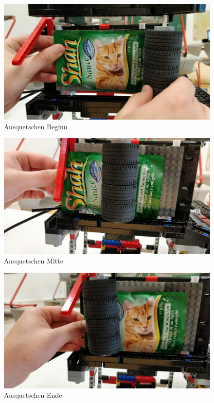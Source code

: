 \begin{figure}[H]
\begin{center}
\includegraphics[width=13cm]{Bilder/Ablauf_1_png/Ausquetschen_1}
\caption{Ausquetschen Beginn}
\label{Ausquetschen Beginn}
\end{center}
\end{figure}

\begin{figure}[H]
\begin{center}
\includegraphics[width=13cm]{Bilder/Ablauf_1_png/Ausquetschen_2}
\caption{Ausquetschen Mitte}
\label{Ausquetschen Mitte}
\end{center}
\end{figure}

\begin{figure}[H]
\begin{center}
\includegraphics[width=13cm]{Bilder/Ablauf_1_png/Ausquetschen_3}
\caption{Ausquetschen Ende}
\label{Ausquetschen Ende}
\end{center}
\end{figure}
\newpage
